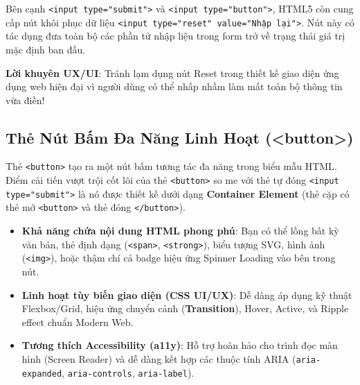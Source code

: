\documentclass[11pt,oneside]{book}
\newcommand{\codeinline}[1]{\textcolor{accentOrange}{\texttt{#1}}}
\newcommand{\term}[1]{\textbf{\textcolor{primaryBlue}{#1}}}
\begin{document}
\begin{tipBox}[Lưu Ý Về Nút Khôi Phục Dữ Liệu \codeinline{<input type="reset">}]
Bên cạnh \codeinline{<input type="submit">} và \codeinline{<input type="button">}, HTML5 còn cung cấp nút khôi phục dữ liệu \codeinline{<input type="reset" value="Nhập lại">}. Nút này có tác dụng đưa toàn bộ các phần tử nhập liệu trong form trở về trạng thái giá trị mặc định ban đầu.
\par\vspace{3pt}
\textbf{Lời khuyên UX/UI}: Tránh lạm dụng nút Reset trong thiết kế giao diện ứng dụng web hiện đại vì người dùng có thể nhấp nhầm làm mất toàn bộ thông tin vừa điền!
\end{tipBox}

\subsection{Thẻ Nút Bấm Đa Năng Linh Hoạt (<button>)}
\label{subsec:button_tag}

\begin{conceptBox}
Thẻ \codeinline{<button>} tạo ra một nút bấm tương tác đa năng trong biểu mẫu HTML. Điểm cải tiến vượt trội cốt lõi của thẻ \codeinline{<button>} so me với thẻ tự đóng \codeinline{<input type="submit">} là nó được thiết kế dưới dạng \term{Container Element} (thẻ cặp có thẻ mở \codeinline{<button>} và thẻ đóng \codeinline{</button>}).
\begin{itemize}[leftmargin=1.5em, itemsep=3pt, parsep=0pt]
    \item \textbf{Khả năng chứa nội dung HTML phong phú}: Bạn có thể lồng bất kỳ văn bản, thẻ định dạng (\codeinline{<span>}, \codeinline{<strong>}), biểu tượng SVG, hình ảnh (\codeinline{<img>}), hoặc thậm chí cả badge hiệu ứng Spinner Loading vào bên trong nút.
    \item \textbf{Linh hoạt tùy biến giao diện (CSS UI/UX)}: Dễ dàng áp dụng kỹ thuật Flexbox/Grid, hiệu ứng chuyển cảnh (\term{Transition}), Hover, Active, và Ripple effect chuẩn Modern Web.
    \item \textbf{Tương thích Accessibility (a11y)}: Hỗ trợ hoàn hảo cho trình đọc màn hình (Screen Reader) và dễ dàng kết hợp các thuộc tính ARIA (\codeinline{aria-expanded}, \codeinline{aria-controls}, \codeinline{aria-label}).
\end{itemize}
\end{conceptBox}
\end{document}
